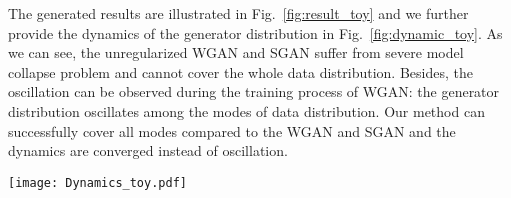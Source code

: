 \documentclass{article}
\newcommand{\fig}[1]{Fig.~\ref{fig:#1}}
\theoremstyle{definition}
\begin{document}
The generated results are illustrated in \fig{result_toy} and we further provide the dynamics of the generator distribution in \fig{dynamic_toy}. As we can see, the unregularized WGAN and SGAN suffer from severe model collapse problem and cannot cover the whole data distribution. Besides, the oscillation can be observed during the training process of WGAN: the generator distribution oscillates among the modes of data distribution.
Our method can successfully cover all modes compared to the WGAN and SGAN and the dynamics are converged instead of oscillation.



\begin{figure*}
    \centering
    \texttt{[image: Dynamics\_toy.pdf]}
    \caption{The training dynamics of various GANs on synthetic data.}
    \label{fig:dynamic_toy}
\end{figure*}
\end{document}
